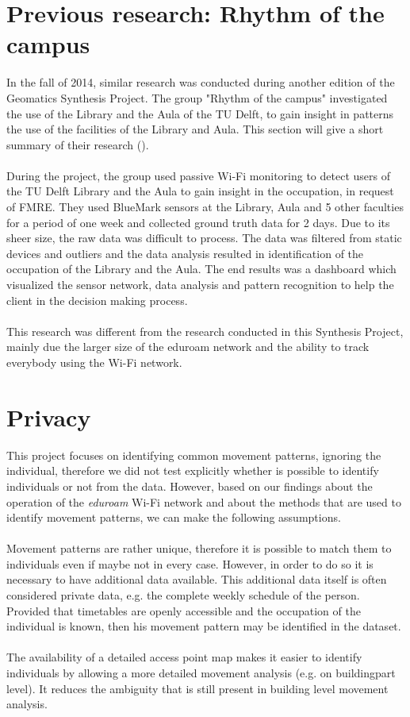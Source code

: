 \section{Previous research: Rhythm of the campus}
In the fall of 2014, similar research was conducted during another edition of the Geomatics Synthesis Project. The group "Rhythm of the campus" investigated the use of the Library and the Aula of the TU Delft, to gain insight in patterns the use of the facilities of the Library and Aula. This section will give a short summary of their research (\cite{rhythmofthecampus}).\\\\
During the project, the group used passive Wi-Fi monitoring to detect users of the TU Delft Library and the Aula to gain insight in the occupation, in request of FMRE. They used BlueMark sensors at the Library, Aula and 5 other faculties for a period of one week and collected ground truth data for 2 days. Due to its sheer size, the raw data was difficult to process. The data was filtered from static devices and outliers and the data analysis resulted in identification of the occupation of the Library and the Aula. The end results was a dashboard which visualized the sensor network, data analysis and pattern recognition to help the client in the decision making process.\\\\
This research was different from the research conducted in this Synthesis Project, mainly due the larger size of the eduroam network and the ability to track everybody using the Wi-Fi network.

\section{Privacy}
This project focuses on identifying common movement patterns, ignoring the individual, therefore we did not test explicitly whether is possible to identify individuals or not from the data. However, based on our findings about the operation of the \textit{eduroam} Wi-Fi network and about the methods that
are used to identify movement patterns, we can make the following assumptions.\\\\
Movement patterns are rather unique, therefore it is possible to match them to individuals even if maybe not in every case. However, in order to do so it is
necessary to have additional data available. This additional data itself is often considered private data, e.g. the complete weekly schedule of the person.
Provided that timetables are openly accessible and the occupation of the individual is known, then his movement pattern may be identified in the dataset.\\\\
The availability of a detailed access point map makes it easier to identify individuals by allowing a more detailed movement analysis (e.g. on buildingpart
level). It reduces the ambiguity that is still present in building level movement analysis.

